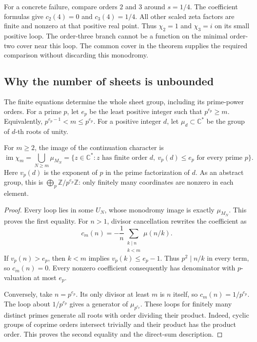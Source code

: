 For a concrete failure, compare orders \(2\) and \(3\) around \(s=1/4\).
The coefficient formulas give \(c_2(4)=0\) and \(c_3(4)=1/4\).
All other scaled zeta factors are finite and nonzero at that positive
real point.  Thus \(\chi_2=1\) and \(\chi_3=i\) on its small positive
loop.  The order-three branch cannot be a function on the minimal
order-two cover near this loop.  The common cover in the theorem supplies
the required comparison without discarding this monodromy.

\subsection{Why the number of sheets is unbounded}

The finite equations determine the whole sheet group, including its
prime-power orders.  For a prime \(p\), let \(e_p\) be the least
positive integer such that \(p^{e_p}\geq m\).  Equivalently,
\(p^{e_p-1}<m\leq p^{e_p}\).
For a positive integer \(d\), let \(\mu_d\subset\mathbb C^*\) be the
group of \(d\)-th roots of unity.

\begin{theorem}
\label{thm:monodromy-group}
For \(m\geq2\), the image of the continuation character is
\[
 \operatorname{im}\chi_m
 =\bigcup_{N\geq m}\mu_{M_N}
 =\{z\in\mathbb C^*:z\text{ has finite order }d,
       \ v_p(d)\leq e_p\text{ for every prime }p\}.
\]
Here \(v_p(d)\) is the exponent of \(p\) in the prime factorization of
\(d\).  As an abstract group, this is
\(\bigoplus_p\mathbb Z/p^{e_p}\mathbb Z\): only finitely many
coordinates are nonzero in each element.
\end{theorem}

\begin{proof}
Every loop lies in some \(U_N\), whose monodromy image is exactly
\(\mu_{M_N}\).  This proves the first equality.
For \(n>1\), divisor cancellation rewrites the coefficient as
\[
 c_m(n)=-\frac1n\sum_{\substack{k\mid n\\k<m}}\mu(n/k).
\]
If \(v_p(n)>e_p\), then \(k<m\) implies \(v_p(k)\leq e_p-1\).
Thus \(p^2\mid n/k\) in every term, so \(c_m(n)=0\).
Every nonzero coefficient consequently has denominator with
\(p\)-valuation at most \(e_p\).

Conversely, take \(n=p^{e_p}\).  Its only divisor at least \(m\) is
\(n\) itself, so \(c_m(n)=1/p^{e_p}\).
The loop about \(1/p^{e_p}\) gives a generator of \(\mu_{p^{e_p}}\).
These loops for finitely many distinct primes generate all roots with
order dividing their product.  Indeed, cyclic groups of coprime orders
intersect trivially and their product has the product order.
This proves the second equality and the direct-sum description.
\end{proof}

